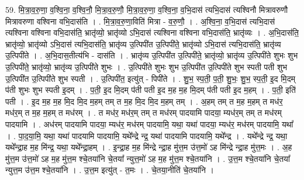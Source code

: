 \documentclass[17pt]{extarticle}
\begin{document}
59. मि॒त्रा॒व॒रु॒णा॒ व॒श्वि॒ना॒ व॒श्वि॒नौ॒ मि॒त्रा॒व॒रु॒णौ॒ मि॒त्रा॒व॒रु॒णा॒ व॒श्वि॒ना॒ व॒भि॒दास॑ त्यभि॒दास॑ त्यश्विनौ मित्रावरुणौ मित्रावरुणा वश्विना वभि॒दास॑ति । . मि॒त्रा॒व॒रु॒णा॒विति॑ मित्रा - व॒रु॒णौ॒ । . अ॒श्वि॒ना॒ व॒भि॒दास॑ त्यभि॒दास॑ त्यश्विना वश्विना वभि॒दास॑ति॒ भ्रातृ॑व्यो॒ भ्रातृ॑व्यो ऽभि॒दास॑ त्यश्विना वश्विना वभि॒दास॑ति॒ भ्रातृ॑व्यः । . अ॒भि॒दास॑ति॒ भ्रातृ॑व्यो॒ भ्रातृ॑व्यो ऽभि॒दास॑ त्यभि॒दास॑ति॒ भ्रातृ॑व्य उ॒त्पिपी॑त उ॒त्पिपी॑ते॒ भ्रातृ॑व्यो ऽभि॒दास॑ त्यभि॒दास॑ति॒ भ्रातृ॑व्य उ॒त्पिपी॑ते । . अ॒भि॒दास॒तीत्य॑भि - दास॑ति । . भ्रातृ॑व्य उ॒त्पिपी॑त उ॒त्पिपी॑ते॒ भ्रातृ॑व्यो॒ भ्रातृ॑व्य उ॒त्पिपी॑ते शुभः शुभ उ॒त्पिपी॑ते॒ भ्रातृ॑व्यो॒ भ्रातृ॑व्य उ॒त्पिपी॑ते शुभः । . उ॒त्पिपी॑ते शुभः शुभ उ॒त्पिपी॑त उ॒त्पिपी॑ते शुभ स्पती पती शुभ उ॒त्पिपी॑त उ॒त्पिपी॑ते शुभ स्पती । . उ॒त्पिपी॑त॒ इत्यु॑त् - पिपी॑ते । . शु॒भ॒ स्प॒ती॒ प॒ती॒ शु॒भः॒ शु॒भ॒ स्प॒ती॒ इ॒द मि॒दम् प॑ती शुभः शुभ स्पती इ॒दम् । . प॒ती॒ इ॒द मि॒दम् प॑ती पती इ॒द म॒ह म॒ह मि॒दम् प॑ती पती इ॒द म॒हम् । . प॒ती॒ इति॑ पती । . इ॒द म॒ह म॒ह मि॒द मि॒द म॒हम् तम् त म॒ह मि॒द मि॒द म॒हम् तम् । . अ॒हम् तम् त म॒ह म॒हम् त मध॑र॒ मध॑र॒म् त म॒ह म॒हम् त मध॑रम् । . त मध॑र॒ मध॑र॒म् तम् त मध॑रम् पादयामि पादया॒ म्यध॑र॒म् तम् त मध॑रम् पादयामि । . अध॑रम् पादयामि पादया॒ म्यध॑र॒ मध॑रम् पादयामि॒ यथा॒ यथा॑ पादया॒ म्यध॑र॒ मध॑रम् पादयामि॒ यथा᳚ । . पा॒द॒या॒मि॒ यथा॒ यथा॑ पादयामि पादयामि॒ यथे᳚न्द्रे न्द्र॒ यथा॑ पादयामि पादयामि॒ यथे᳚न्द्र । . यथे᳚न्द्रे न्द्र॒ यथा॒ यथे᳚न्द्रा॒ह म॒ह मि॑न्द्र॒ यथा॒ यथे᳚न्द्रा॒हम् । . इ॒न्द्रा॒ह म॒ह मि॑न्द्रे न्द्रा॒ह मु॑त्त॒म उ॑त्त॒मो॑ ऽह मि॑न्द्रे न्द्रा॒ह मु॑त्त॒मः । . अ॒ह मु॑त्त॒म उ॑त्त॒मो॑ ऽह म॒ह मु॑त्त॒म श्चे॒तया॑नि चे॒तया᳚ न्युत्त॒मो॑ ऽह म॒ह मु॑त्त॒म श्चे॒तया॑नि । . उ॒त्त॒म श्चे॒तया॑नि चे॒तया᳚ न्युत्त॒म उ॑त्त॒म श्चे॒तया॑नि । . उ॒त्त॒म इत्यु॑त् - त॒मः । . चे॒तया॒नीति॑ चे॒तया॑नि । \newline
\pagebreak
{}
\end{document}
